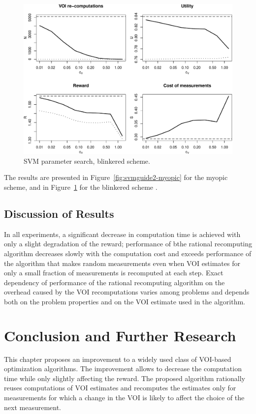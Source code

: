 \begin{figure}[h]
\centering
\includegraphics[scale=0.63]{svmguide2-blinkered.pdf}
\caption{SVM parameter search, blinkered scheme.}
\label{fig:svmguide2-blinkered}
\end{figure}
The results are presented in Figure~\ref{fig:svmguide2-myopic} for the
myopic scheme, and in Figure~\ref{fig:svmguide2-blinkered} for the
blinkered scheme \cite{TolpinShimony.blinkered}.

\subsection{Discussion of Results}

In all experiments, a significant decrease in computation time is
achieved with only a slight degradation of the reward; performance of
bthe rational recomputing algorithm decreases slowly with the
computation cost and exceeds performance of the algorithm that
makes random measurements even when VOI estimates for only a small fraction of
measurements is recomputed at each step. Exact dependency of
performance of the rational recomputing algorithm on the
overhead caused by the VOI recomputations varies among problems and depends
both on the problem properties and on the VOI estimate used in the
algorithm.

\section{Conclusion and Further Research}
\label{sec:raticomp-conclusion}

This chapter proposes an improvement to a widely used class of VOI-based
optimization algorithms. The improvement allows to decrease the
computation time while only slightly affecting the reward. The
proposed algorithm rationally reuses computations of VOI estimates and
recomputes the estimates only for measurements for which a change in
the VOI is likely to affect the choice of the next
measurement.

